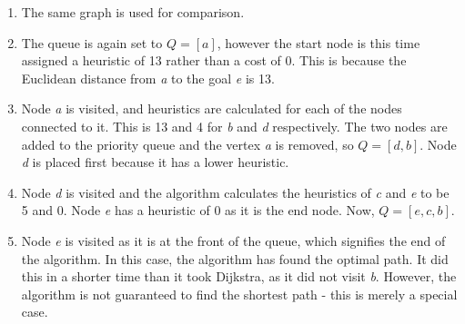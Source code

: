 \documentclass[titlepage]{article}
\begin{document}
\begin{enumerate}
\item The same graph is used for comparison. 
\item The queue is again set to  \(Q = [a]\), however the start node is this time assigned a heuristic of 13 rather than a cost of 0. This is because the Euclidean distance from \textit{a} to the goal \textit{e} is 13.
\item Node \textit{a} is visited, and heuristics are calculated for each of the nodes connected to it. This is 13 and 4 for \textit{b} and \textit{d} respectively. The two nodes are added to the priority queue and the vertex \textit{a} is removed, so \(Q = [d,b]\). Node \textit{d} is placed first because it has a lower heuristic.
\item Node \textit{d} is visited and the algorithm calculates the heuristics of \textit{c} and \textit{e} to be 5 and 0. Node \textit{e} has a heuristic of 0 as it is the end node. Now, \(Q = [e,c,b]\).
\item Node \textit{e} is visited as it is at the front of the queue, which signifies the end of the algorithm. In this case, the algorithm has found the optimal path. It did this in a shorter time than it took Dijkstra, as it did not visit \textit{b}. However, the algorithm is not guaranteed to find the shortest path - this is merely a special case.
\end{enumerate}
\end{document}

